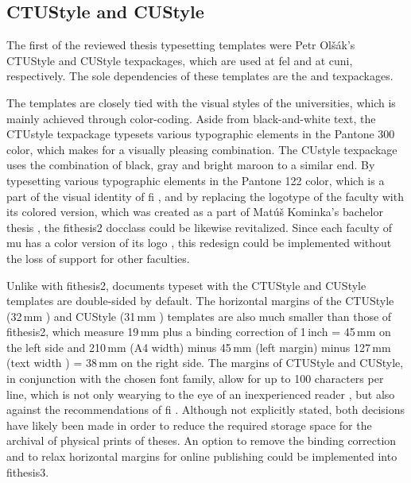       \subsection{CTUStyle and CUStyle}
      The first of the reviewed thesis typesetting templates were Petr Olšák's CTUStyle \cite{ctustyle} and CUStyle \cite{custyle} \glspl{texpackage}, which are used at \gls{fel} and at \gls{cuni}, respectively. The sole dependencies of these templates are the  and  \glspl{texpackage}.

      The templates are closely tied with the visual styles of the universities, which is mainly achieved through color-coding. Aside from black-and-white text, the CTUstyle \gls{texpackage} typesets various typographic elements in the  Pantone 300 color, which makes for a visually pleasing combination. The CUstyle \gls{texpackage} uses the combination of black, gray and  bright maroon to a similar end. By typesetting various typographic elements in the  Pantone 122 color, which is a part of the visual identity of \gls{fi} \cite{filogo}, and by replacing the logotype of the faculty with its colored version, which was created as a part of Matúš Kominka's bachelor thesis \cite{Kominka08}, the fithesis2 \gls{docclass} could be likewise revitalized.  Since each faculty of \gls{mu} has a color version of its logo \cite{muvis}, this redesign could be implemented without the loss of support for other faculties. 

      Unlike with fithesis2, documents typeset with the CTUStyle and CUStyle templates are double-sided by default. The horizontal margins of the CTUStyle (32\,mm \cite[line 249]{ctustyleCode}) and CUStyle (31\,mm \cite[line 229]{custyleCode}) templates are also much smaller than those of fithesis2, which measure 19\,mm \cite[lines 968\nobreakdash--976]{fithesis2Code} plus a binding correction of 1\,inch \cite{latexlayout} = 45\,mm on the left side and 210\,mm (A4 width) minus 45\,mm (left margin) minus 127\,mm (text width \cite[lines~989, 1017, 1045]{fithesis2Code}) = 38\,mm on the right side. The margins of CTUStyle and CUStyle, in conjunction with the chosen font family, allow for up to 100 characters per line, which is not only wearying to the eye of an inexperienced reader , but also against the recommendations of \gls{fi} \cite[section 3.2.3]{bpdpfi}. Although not explicitly stated, both decisions have likely been made in order to reduce the required storage space for the archival of physical prints of theses. An option to remove the binding correction and to relax horizontal margins for online publishing could be implemented into fithesis3. 

